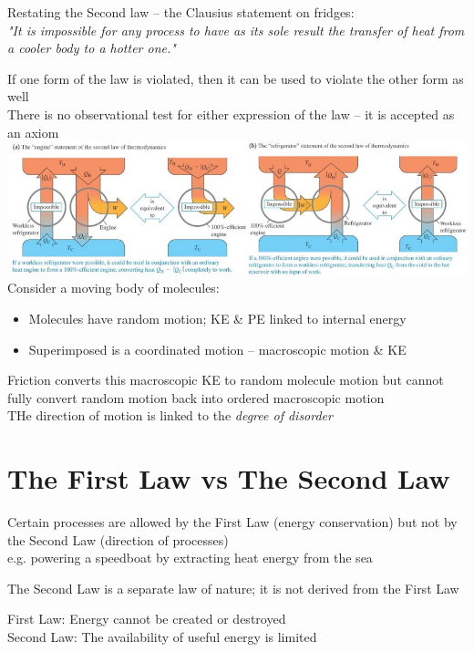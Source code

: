 \documentclass[a4paper, 11pt, normalem]{report}
\begin{document}
Restating the Second law -- the Clausius statement on fridges: \\
\emph{"It is impossible for any process to have as its sole result the transfer of heat from a cooler body to a hotter one."}

If one form of the law is violated, then it can be used to violate the other form as well \\
There is no observational test for either expression of the law -- it is accepted as an axiom \\
\includegraphics[scale=0.69]{Impossible.jpg} \\
Consider a moving body of molecules:
\begin{itemize}
	\item[] Molecules have random motion; KE \& PE linked to internal energy
	\item[] Superimposed is a coordinated motion -- macroscopic motion \& KE
\end{itemize}
Friction converts this macroscopic KE to random molecule motion but cannot fully convert random motion back into ordered macroscopic motion \\
THe direction of motion is linked to the \emph{degree of disorder}

\section{The First Law vs The Second Law}
Certain processes are allowed by the First Law (energy conservation) but not by the Second Law (direction of processes) \\
e.g. powering a speedboat by extracting heat energy from the sea

The Second Law is a separate law of nature; it is not derived from the First Law

First Law: Energy cannot be created or destroyed \\
Second Law: The availability of useful energy is limited
\end{document}
